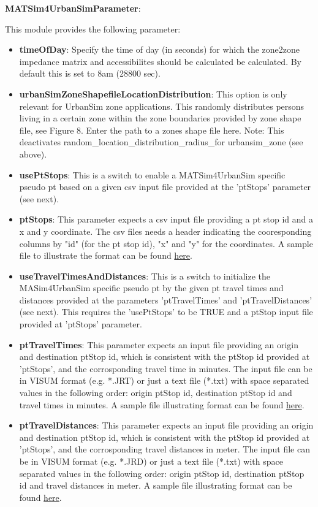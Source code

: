 \documentclass[a4paper,11pt]{report}
\begin{document}
\textbf{MATSim4UrbanSimParameter}:

This module provides the following parameter:
\begin{itemize}
	\item \textbf{timeOfDay}: Specify the time of day (in seconds)  for which the zone2zone impedance matrix and accessibilites should be  calculated be calculated. By default this is set to 8am (28800 sec).
	\item \textbf{urbanSimZoneShapefileLocationDistribution}: This  option is only relevant for UrbanSim zone applications. This randomly  distributes persons living in a certain zone within the zone boundaries  provided by zone shape file, see Figure 8. Enter the path to a zones  shape file here. Note: This deactivates random\_location\_distribution\_radius\_for urbansim\_zone (see above).
	\item \textbf{usePtStops}: This is a switch to enable a  MATSim4UrbanSim specific pseudo pt based on a given csv input file  provided at the 'ptStops' parameter (see next).
	\item \textbf{ptStops}: This parameter expects a csv input file  providing a pt stop id and a x and y coordinate. The csv files needs a  header indicating the cooresponding columns by "id" (for the pt stop  id), "x" and "y" for the coordinates. A sample file to illustrate the  format can be found \href{https://svn.vsp.tu-berlin.de/repos/public-svn/matsim/examples/countries/us/seattle/ptStops.csv}{here}.
	\item \textbf{useTravelTimesAndDistances}: This is a switch to  initialize the MASim4UrbanSim specific pseudo pt by the given pt travel  times and distances provided at the parameters 'ptTravelTimes' and  'ptTravelDistances' (see next). This requires the 'usePtStops' to be TRUE and a ptStop input file provided at 'ptStops' parameter.
	\item \textbf{ptTravelTimes}: This parameter expects an input  file providing an origin and destination ptStop id, which is consistent  with the ptStop id provided at 'ptStops', and the corrosponding travel  time in minutes. The input file can be in VISUM format (e.g. *.JRT) or  just a text file (*.txt) with space separated values in the following  order: origin ptStop id, destination ptStop id and travel times in  minutes. A sample file illustrating format can be found \href{https://svn.vsp.tu-berlin.de/repos/public-svn/matsim/examples/countries/us/seattle/sampleTravelTimes.jrt}{here}.
	\item \textbf{ptTravelDistances}: This parameter expects an input  file providing an origin and destination ptStop id, which is consistent  with the ptStop id provided at 'ptStops', and the corrosponding travel  distances in meter. The input file can be in VISUM format (e.g. *.JRD)  or just a text file (*.txt) with space separated values in the following  order: origin ptStop id, destination ptStop id and travel distances in  meter. A sample file illustrating format can be found \href{https://svn.vsp.tu-berlin.de/repos/public-svn/matsim/examples/countries/us/seattle/sampleTravelTimes.jrt}{here}.
\end{itemize}
\end{document}
